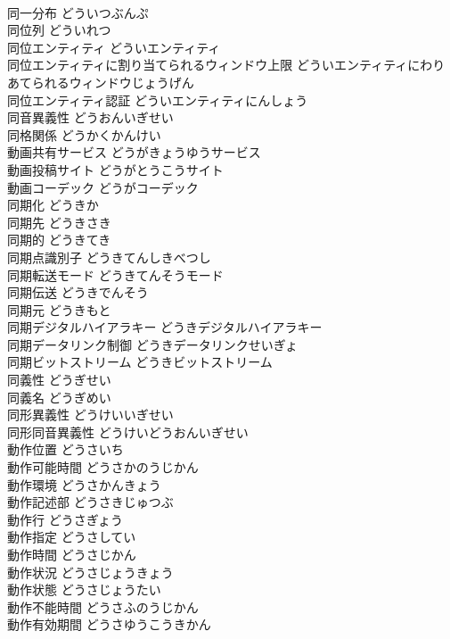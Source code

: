 \documentclass[8pt]{extreport}
\begin{document}
\begin{CJK}{UTF8}{min}
\\	同一分布	どういつぶんぷ	
\\	同位列	どういれつ	
\\	同位エンティティ	どういエンティティ	
\\	同位エンティティに割り当てられるウィンドウ上限	どういエンティティにわりあてられるウィンドウじょうげん	
\\	同位エンティティ認証	どういエンティティにんしょう	
\\	同音異義性	どうおんいぎせい	
\\	同格関係	どうかくかんけい	
\\	動画共有サービス	どうがきょうゆうサービス	
\\	動画投稿サイト	どうがとうこうサイト	
\\	動画コーデック	どうがコーデック	
\\	同期化	どうきか	
\\	同期先	どうきさき	
\\	同期的	どうきてき	
\\	同期点識別子	どうきてんしきべつし	
\\	同期転送モード	どうきてんそうモード	
\\	同期伝送	どうきでんそう	
\\	同期元	どうきもと	
\\	同期デジタルハイアラキー	どうきデジタルハイアラキー	
\\	同期データリンク制御	どうきデータリンクせいぎょ	
\\	同期ビットストリーム	どうきビットストリーム	
\\	同義性	どうぎせい	
\\	同義名	どうぎめい	
\\	同形異義性	どうけいいぎせい	
\\	同形同音異義性	どうけいどうおんいぎせい	
\\	動作位置	どうさいち	
\\	動作可能時間	どうさかのうじかん	
\\	動作環境	どうさかんきょう	
\\	動作記述部	どうさきじゅつぶ	
\\	動作行	どうさぎょう	
\\	動作指定	どうさしてい	
\\	動作時間	どうさじかん	
\\	動作状況	どうさじょうきょう	
\\	動作状態	どうさじょうたい	
\\	動作不能時間	どうさふのうじかん	
\\	動作有効期間	どうさゆうこうきかん	

\end{CJK}
\end{document}
